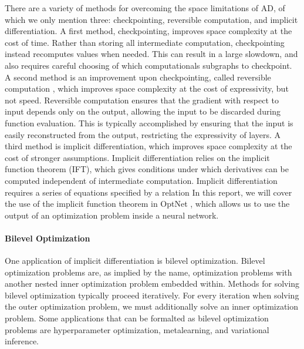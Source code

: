 \documentclass[11pt]{article}
\begin{document}
There are a variety of methods for overcoming the space limitations of AD,
of which we only mention three: checkpointing, reversible computation, and implicit differentiation.
A first method, checkpointing, improves space complexity at the cost of time.
Rather than storing all intermediate computation,
checkpointing instead recomputes values when needed.
This can result in a large slowdown,
and also requires careful choosing of which computationals subgraphs to checkpoint.
A second method is an improvement upon checkpointing, called reversible computation \citep{maclaurin2015reversible,gomez2017reversible},
which improves space complexity at the cost of expressivity, but not speed.
Reversible computation ensures that the gradient with respect to input depends only on the output,
allowing the input to be discarded during function evaluation.
This is typically accomplished by ensuring that the input is easily reconstructed from the output,
restricting the expressivity of layers.
A third method is implicit differentiation,
which improves space complexity at the cost of stronger assumptions.
Implicit differentiation relies on the implicit function theorem (IFT),
which gives conditions under which derivatives can be computed independent of
intermediate computation.
Implicit differentiation requires a series of equations specified by a relation
In this report, we will cover the use of the implicit function theorem
in OptNet \citep{optnet}, which allows us to use the output of an
optimization problem inside a neural network.

\paragraph{Bilevel Optimization}
One application of implicit differentiation is bilevel optimization.
Bilevel optimization problems are, as implied by the name,
optimization problems with another nested inner optimization problem embedded within.
Methods for solving bilevel optimization typically proceed iteratively.
For every iteration when solving the outer optimization problem,
we must additionally solve an inner optimization problem.
Some applications that can be formalted as bilevel optimization problems are
hyperparameter optimization, metalearning, and variational inference.
\end{document}
